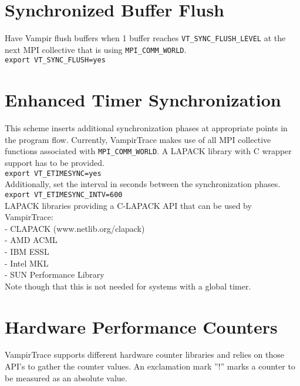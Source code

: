 \begin{multicols}{3}
\section{Synchronized Buffer Flush}
Have Vampir flush buffers when 1 buffer reaches \texttt{VT\_SYNC\_FLUSH\_LEVEL} at the next MPI collective that is using \texttt{MPI\_COMM\_WORLD}.\\
\texttt{export VT\_SYNC\_FLUSH=yes}

\section{Enhanced Timer Synchronization}
This scheme inserts additional synchronization phases at appropriate
points in the program flow. Currently, VampirTrace makes use of all MPI collective
functions associated with \texttt{MPI\_COMM\_WORLD}. A LAPACK library with C wrapper support has to be provided.\\
\texttt{export VT\_ETIMESYNC=yes}\\
Additionally, set the interval in seconds between the synchronization phases.\\
\texttt{export VT\_ETIMESYNC\_INTV=600}\\
LAPACK libraries providing a C-LAPACK API that can be used by VampirTrace:\\
- CLAPACK (www.netlib.org/clapack)\\
- AMD ACML\\
- IBM ESSL\\
- Intel MKL\\
- SUN Performance Library\\
Note though that this is not needed for systems with a global timer.

\section{Hardware Performance Counters}
VampirTrace supports different hardware counter libraries and relies on those API's to gather the counter values. An exclamation mark ''!'' marks a counter to be measured as an absolute value.


\end{multicols}
